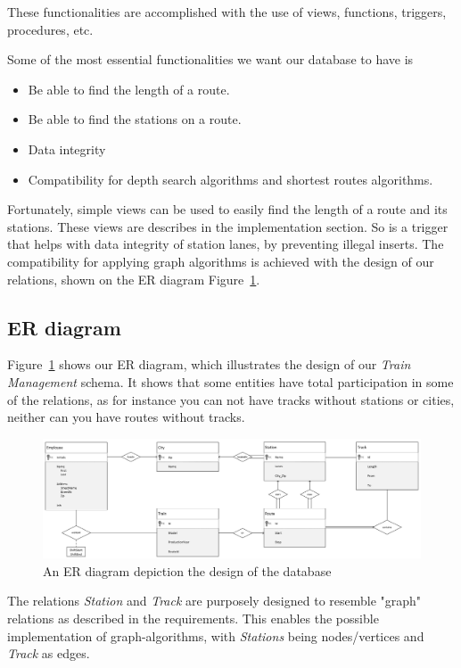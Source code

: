 These functionalities are accomplished with the use of views, functions, 
triggers, procedures, etc.

Some of the most essential functionalities we want our database to have is
\begin{itemize}
\item Be able to find the length of a route.
\item Be able to find the stations on a route.
\item Data integrity
\item Compatibility for depth search algorithms and shortest routes algorithms.
\end{itemize}

Fortunately, simple views can be used to easily find the length of a route and its stations. These views are describes in the implementation section. So is a trigger that helps with data integrity of station lanes, by preventing illegal inserts. The compatibility for applying graph algorithms is achieved with the design of our relations, shown on the ER diagram Figure~\ref{fig:ER}.

\subsection{ER diagram}
Figure~\ref{fig:ER} shows our ER diagram, which illustrates the design of our 
\emph{Train Management} schema. It shows that some entities have total 
participation in some of the relations, as for instance you can not have tracks 
without stations or cities, neither can you have routes without tracks.

\begin{figure}[ht!]
    \centering
    \includegraphics[angle=90,origin=c,width=.45\textwidth]{img/Handwritten_ER}
    \caption{An ER diagram depiction the design of the database}
    \label{fig:ER}
\end{figure}


The relations \emph{Station} and \emph{Track} are purposely designed to resemble "graph" relations as described in the requirements. This enables the possible implementation of graph-algorithms, with \emph{Stations} being nodes/vertices and \emph{Track} as edges.

